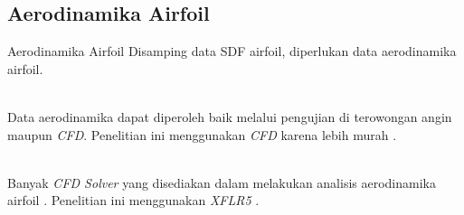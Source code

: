 \subsection{Aerodinamika Airfoil}
\begin{frame}{Aerodinamika Airfoil}
  Disamping data SDF airfoil, diperlukan data aerodinamika airfoil.\\~\\
  \pause

  Data aerodinamika dapat diperoleh baik melalui pengujian di terowongan angin maupun \textit{CFD}. Penelitian ini menggunakan \textit{CFD} karena lebih murah \cite{eppler2012airfoil}.\\~\\
  \pause

  Banyak \textit{CFD Solver} yang disediakan dalam melakukan analisis aerodinamika airfoil \cite{gunel2016comparison}. Penelitian ini menggunakan \textit{XFLR5} \cite{marten2010integration}.
\end{frame}
